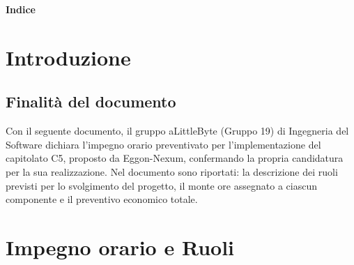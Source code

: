 \documentclass[a4paper,12pt]{article}
\begin{document}
\newpage
{}
\setcounter{page}{1}

\begin{center} 
    {\Large \textbf{Indice}}
\end{center}

\vspace{0.6cm}

\tableofcontents

\newpage

\section{Introduzione}
\subsection{Finalità del documento}

Con il seguente documento, il gruppo aLittleByte (Gruppo 19) di Ingegneria del Software dichiara l'impegno orario preventivato per l'implementazione del capitolato C5, proposto da Eggon-Nexum, confermando la propria candidatura per la sua realizzazione.
Nel documento sono riportati: la descrizione dei ruoli previsti per lo svolgimento del progetto, il monte ore assegnato a ciascun componente e il preventivo economico totale.

\section{Impegno orario e Ruoli}
\end{document}
